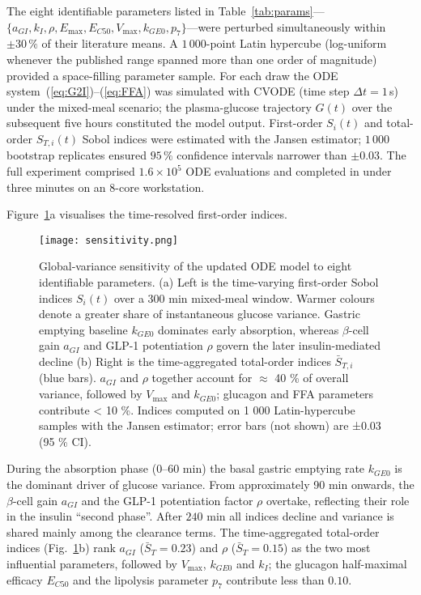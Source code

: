 \documentclass[9pt,shortpaper,twoside,web]{ieeecolor}
\begin{document}
The eight identifiable parameters listed in Table~\ref{tab:params}---$\{a_{GI},k_{I},\rho,E_{\max},E_{C50}, V_{\max},k_{GE0},p_{7}\}$---were perturbed simultaneously within $\pm30\,\%$ of their literature means.   A $1\,000$-point Latin hypercube (log-uniform whenever the published range spanned more than one order of magnitude) provided a space-filling parameter sample.   For each draw the ODE system~(\ref{eq:G2I})–(\ref{eq:FFA}) was simulated with CVODE (time step $\Delta t=1$\,s) under the mixed-meal scenario; the plasma-glucose trajectory $G(t)$ over the subsequent five hours
constituted the model output.  
First-order $S_i(t)$ and total-order $S_{T,i}(t)$ Sobol indices were estimated with the Jansen estimator; $1\,000$ bootstrap replicates ensured $95\,\%$ confidence intervals narrower than $\pm0.03$.  
The full experiment comprised $1.6\times10^{5}$ ODE evaluations and completed in under three minutes on an 8-core workstation.

Figure~\ref{fig:sensitivity}a visualises the time-resolved first-order indices.  
\begin{figure}
    \centering
    \texttt{[image: sensitivity.png]}
    \caption{Global‐variance sensitivity of the updated ODE model to eight identifiable parameters.
(a) Left is the time-varying first-order Sobol indices $S_i(t)$ over a 300 min mixed-meal window. Warmer colours denote a greater share of instantaneous glucose variance. Gastric emptying baseline $k_{GE0}$ dominates early absorption, whereas $\beta$-cell gain $a_{GI}$ and GLP-1 potentiation $\rho$ govern the later insulin-mediated decline (b) Right is the time-aggregated total-order indices $\bar{S}_{T,i}$ (blue bars). $a_{GI}$ and $\rho$ together account for $\approx$ 40 \% of overall variance, followed by $V_{\max}$ and $k_{GE0}$; glucagon and FFA parameters contribute < 10 \%. Indices computed on 1 000 Latin-hypercube samples with the Jansen estimator; error bars (not shown) are ±0.03 (95 \% CI).}
    \label{fig:sensitivity}
\end{figure}

During the absorption phase ($0$--$60$ min) the basal gastric emptying rate $k_{GE0}$ is the dominant driver of glucose variance. From approximately 90 min onwards, the $\beta$-cell gain $a_{GI}$ and the GLP-1 potentiation factor $\rho$ overtake, reflecting their role
in the insulin ``second phase''.  
After $240$ min all indices decline and variance is shared mainly among the clearance terms.  
The time-aggregated total-order indices (Fig.~\ref{fig:sensitivity}b) rank
$a_{GI}$ ($\bar S_{T}=0.23$) and $\rho$ ($\bar S_{T}=0.15$) as the two most influential parameters, followed by $V_{\max}$, $k_{GE0}$ and $k_{I}$; the glucagon
half-maximal efficacy $E_{C50}$ and the lipolysis parameter $p_{7}$ contribute less than $0.10$.
\end{document}
